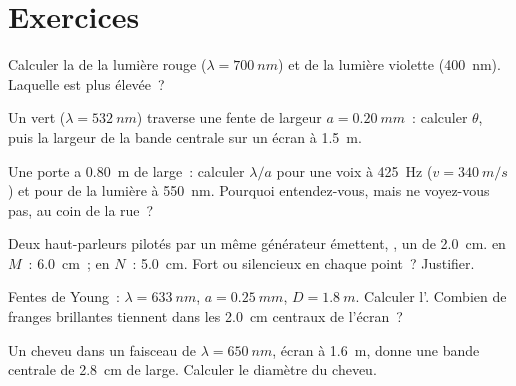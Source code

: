 \section{Exercices}

\begin{exercise}[$\star$]\label{exo:g12:light-as-wave:1}
Calculer la  de la lumière rouge
($\lambda = \qty{700}{nm}$) et de la lumière violette (\qty{400}{nm}).
Laquelle est plus élevée~?
\end{exercise}

\begin{exercise}[$\star$]\label{exo:g12:light-as-wave:2}
Un  vert ($\lambda = \qty{532}{nm}$) traverse une fente
de largeur $a = \qty{0.20}{mm}$~: calculer $\theta$, puis la largeur
de la bande centrale sur un écran à \qty{1.5}{m}.
\end{exercise}

\begin{exercise}[$\star$]\label{exo:g12:light-as-wave:3}
Une porte a \qty{0.80}{m} de large~: calculer $\lambda/a$ pour une
voix à \qty{425}{Hz} ($v = \qty{340}{m/s}$) et pour de la lumière à
\qty{550}{nm}. Pourquoi entendez-vous, mais ne voyez-vous pas, au coin
de la rue~?
\end{exercise}

\begin{exercise}[$\star$]\label{exo:g12:light-as-wave:4}
Deux haut-parleurs pilotés par un même générateur émettent, ,
un  de  \qty{2.0}{cm}.
 en $M$~: \qty{6.0}{cm}~; en $N$~:
\qty{5.0}{cm}. Fort ou silencieux en chaque point~? Justifier.
\end{exercise}

\begin{exercise}[$\star$]\label{exo:g12:light-as-wave:5}
Fentes de Young~: $\lambda = \qty{633}{nm}$, $a = \qty{0.25}{mm}$,
$D = \qty{1.8}{m}$. Calculer l'. Combien de
franges brillantes tiennent dans les \qty{2.0}{cm} centraux de
l'écran~?
\end{exercise}

\begin{exercise}[$\star\star$]\label{exo:g12:light-as-wave:6}
Un cheveu dans un faisceau de $\lambda = \qty{650}{nm}$, écran à
\qty{1.6}{m}, donne une bande centrale de \qty{2.8}{cm} de large.
Calculer le diamètre du cheveu.
\end{exercise}

